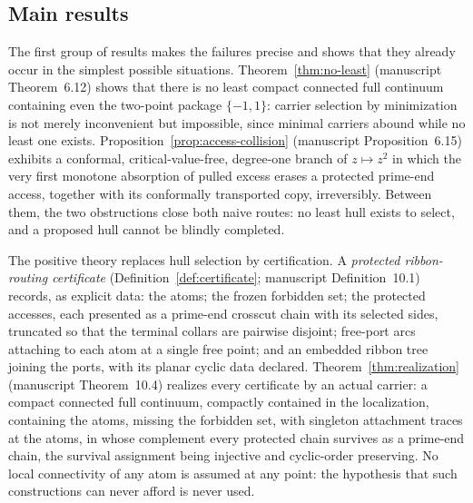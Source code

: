 \documentclass[11pt,reqno]{amsart}
\theoremstyle{definition}
\theoremstyle{remark}
\begin{document}
\subsection{Main results}\label{subsec:A-results}

The first group of results makes the failures precise and shows that they
already occur in the simplest possible situations.
Theorem~\ref{thm:no-least} (manuscript Theorem~6.12) shows that there is no
least compact connected full continuum containing even the two-point package
$\{-1,1\}$: carrier selection by minimization is not merely inconvenient but
impossible, since minimal carriers abound while no least one exists.
Proposition~\ref{prop:access-collision} (manuscript Proposition~6.15)
exhibits a conformal, critical-value-free, degree-one branch of $z\mapsto
z^{2}$ in which the very first monotone absorption of pulled excess erases a
protected prime-end access, together with its conformally transported copy,
irreversibly.  Between them, the two obstructions close both naive routes: no
least hull exists to select, and a proposed hull cannot be blindly
completed.

The positive theory replaces hull selection by certification.  A
\emph{protected ribbon-routing certificate}
(Definition~\ref{def:certificate}; manuscript Definition~10.1) records, as
explicit data: the atoms; the frozen forbidden set; the protected accesses,
each presented as a prime-end crosscut chain with its selected sides,
truncated so that the terminal collars are pairwise disjoint; free-port arcs
attaching to each atom at a single free point; and an embedded ribbon
tree joining the ports, with its planar cyclic data declared.
Theorem~\ref{thm:realization} (manuscript Theorem~10.4) realizes every
certificate by an actual carrier: a compact connected full continuum,
compactly contained in the localization, containing the atoms, missing the
forbidden set, with singleton attachment traces at the atoms, in whose
complement every protected chain survives as a prime-end chain, the survival
assignment being injective and cyclic-order preserving.  No local
connectivity of any atom is assumed at any point: the hypothesis that such
constructions can never afford is never used.
\end{document}
